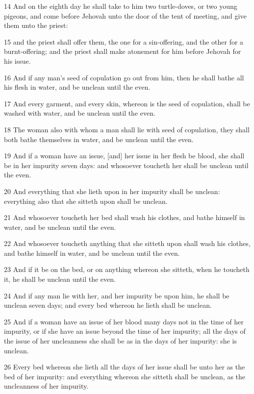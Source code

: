\par 14 And on the eighth day he shall take to him two turtle-doves, or two young pigeons, and come before Jehovah unto the door of the tent of meeting, and give them unto the priest:
\par 15 and the priest shall offer them, the one for a sin-offering, and the other for a burnt-offering; and the priest shall make atonement for him before Jehovah for his issue.
\par 16 And if any man's seed of copulation go out from him, then he shall bathe all his flesh in water, and be unclean until the even.
\par 17 And every garment, and every skin, whereon is the seed of copulation, shall be washed with water, and be unclean until the even.
\par 18 The woman also with whom a man shall lie with seed of copulation, they shall both bathe themselves in water, and be unclean until the even.
\par 19 And if a woman have an issue, [and] her issue in her flesh be blood, she shall be in her impurity seven days: and whosoever toucheth her shall be unclean until the even.
\par 20 And everything that she lieth upon in her impurity shall be unclean: everything also that she sitteth upon shall be unclean.
\par 21 And whosoever toucheth her bed shall wash his clothes, and bathe himself in water, and be unclean until the even.
\par 22 And whosoever toucheth anything that she sitteth upon shall wash his clothes, and bathe himself in water, and be unclean until the even.
\par 23 And if it be on the bed, or on anything whereon she sitteth, when he toucheth it, he shall be unclean until the even.
\par 24 And if any man lie with her, and her impurity be upon him, he shall be unclean seven days; and every bed whereon he lieth shall be unclean.
\par 25 And if a woman have an issue of her blood many days not in the time of her impurity, or if she have an issue beyond the time of her impurity; all the days of the issue of her uncleanness she shall be as in the days of her impurity: she is unclean.
\par 26 Every bed whereon she lieth all the days of her issue shall be unto her as the bed of her impurity: and everything whereon she sitteth shall be unclean, as the uncleanness of her impurity.
